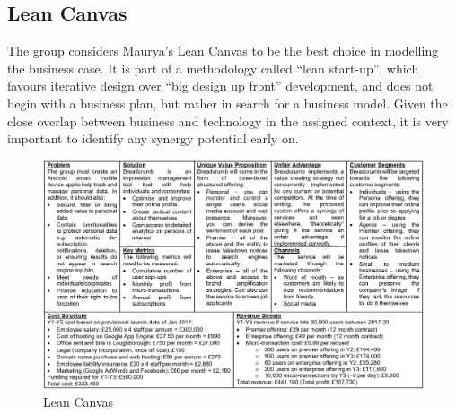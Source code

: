 
\subsection{Lean Canvas}

The group considers Maurya's Lean Canvas to be the best choice in modelling the business case. It is part of a methodology called ``lean start-up'', which favours iterative design over ``big design up front'' development, and does not begin with a business plan, but rather in search for a business model. Given the close overlap between business and technology in the assigned context, it is very important to identify any synergy potential early on.

\begin{figure}
  \centering
  \begin{minipage}{140mm}
    \centering
    \includegraphics[width=140mm]{inc/lean_canvas.png}
    \caption{Lean Canvas}
    \label{fig:lean_canvas}
  \end{minipage}
\end{figure}



